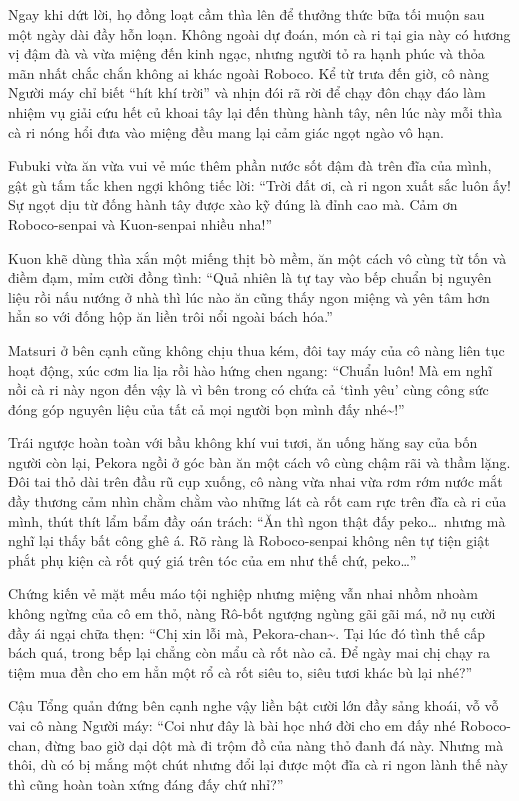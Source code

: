 \documentclass[../main.tex]{subfiles}
\begin{document}
Ngay khi dứt lời, họ đồng loạt cầm thìa lên để thưởng thức bữa tối muộn sau một ngày dài đầy hỗn loạn. Không ngoài dự đoán, món cà ri tại gia này có hương vị đậm đà và vừa miệng đến kinh ngạc, nhưng người tỏ ra hạnh phúc và thỏa mãn nhất chắc chắn không ai khác ngoài Roboco. Kể từ trưa đến giờ, cô nàng Người máy chỉ biết ``hít khí trời'' và nhịn đói rã rời để chạy đôn chạy đáo làm nhiệm vụ giải cứu hết củ khoai tây lại đến thùng hành tây, nên lúc này mỗi thìa cà ri nóng hổi đưa vào miệng đều mang lại cảm giác ngọt ngào vô hạn.

Fubuki vừa ăn vừa vui vẻ múc thêm phần nước sốt đậm đà trên đĩa của mình, gật gù tấm tắc khen ngợi không tiếc lời: ``Trời đất ơi, cà ri ngon xuất sắc luôn ấy! Sự ngọt dịu từ đống hành tây được xào kỹ đúng là đỉnh cao mà. Cảm ơn Roboco-senpai và Kuon-senpai nhiều nha!''

Kuon khẽ dùng thìa xắn một miếng thịt bò mềm, ăn một cách vô cùng từ tốn và điềm đạm, mỉm cười đồng tình: ``Quả nhiên là tự tay vào bếp chuẩn bị nguyên liệu rồi nấu nướng ở nhà thì lúc nào ăn cũng thấy ngon miệng và yên tâm hơn hẳn so với đống hộp ăn liền trôi nổi ngoài bách hóa.''

Matsuri ở bên cạnh cũng không chịu thua kém, đôi tay máy của cô nàng liên tục hoạt động, xúc cơm lia lịa rồi hào hứng chen ngang: ``Chuẩn luôn! Mà em nghĩ nồi cà ri này ngon đến vậy là vì bên trong có chứa cả `tình yêu' cùng công sức đóng góp nguyên liệu của tất cả mọi người bọn mình đấy nhé\~{}!''

Trái ngược hoàn toàn với bầu không khí vui tươi, ăn uống hăng say của bốn người còn lại, Pekora ngồi ở góc bàn ăn một cách vô cùng chậm rãi và thầm lặng. Đôi tai thỏ dài trên đầu rũ cụp xuống, cô nàng vừa nhai vừa rơm rớm nước mắt đầy thương cảm nhìn chằm chằm vào những lát cà rốt cam rực trên đĩa cà ri của mình, thút thít lẩm bẩm đầy oán trách: ``Ăn thì ngon thật đấy peko\dots\ nhưng mà nghĩ lại thấy bất công ghê á. Rõ ràng là Roboco-senpai không nên tự tiện giật phắt phụ kiện cà rốt quý giá trên tóc của em như thế chứ, peko\dots''

Chứng kiến vẻ mặt mếu máo tội nghiệp nhưng miệng vẫn nhai nhồm nhoàm không ngừng của cô em thỏ, nàng Rô-bốt ngượng ngùng gãi gãi má, nở nụ cười đầy ái ngại chữa thẹn: ``Chị xin lỗi mà, Pekora-chan\~{}. Tại lúc đó tình thế cấp bách quá, trong bếp lại chẳng còn mẩu cà rốt nào cả. Để ngày mai chị chạy ra tiệm mua đền cho em hẳn một rổ cà rốt siêu to, siêu tươi khác bù lại nhé?''

Cậu Tổng quản đứng bên cạnh nghe vậy liền bật cười lớn đầy sảng khoái, vỗ vỗ vai cô nàng Người máy: ``Coi như đây là bài học nhớ đời cho em đấy nhé Roboco-chan, đừng bao giờ dại dột mà đi trộm đồ của nàng thỏ đanh đá này. Nhưng mà thôi, dù có bị mắng một chút nhưng đổi lại được một đĩa cà ri ngon lành thế này thì cũng hoàn toàn xứng đáng đấy chứ nhỉ?''
\end{document}
